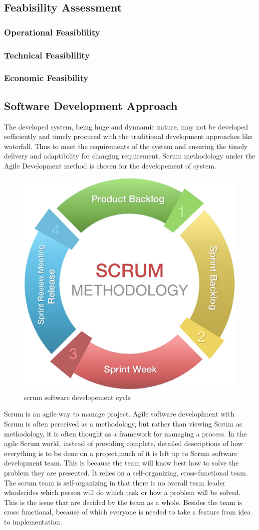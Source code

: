 \subsection{Feabisility Assessment}
\subsubsection{Operational Feasiblility}
\subsubsection{Technical Feasiblility}
\subsubsection{Economic Feasibility}
\subsection{Software Development Approach}
The developed system, being huge and dynnamic nature, may not be developed eefficiently and timely procured with the traditional development approaches like waterfall. Thus to meet the requirements of the system and ensuring the timely delivery and adaptibility for changing requirement, Scrum methodology under the Agile Development method is chosen for the developement of system.


\begin{figure}[!ht]
\centering
\includegraphics[width = 5 cm]{fig/scrum-chart.jpg}
\caption{scrum software developement cycle}
\label{fig:scrum}
\end{figure}
Scrum is an agile way to manage project. Agile software developlment with Scrum is often perceived as a methodology, but rather than viewing Scrum as methodology, it is often thought as a framework for managing a process. In the agile Scrum world, instead of providing complete, detailed descriptions of how everything is to be done on a project,much of it is left up to Scrum software development team. This is because the team will know best how to solve the problem they are presented. It relies on a self-organizing, cross-functional team. The scrum team is self-organizing in that there is no overall team leader whodecides which person will do which task or how a problem will be solved. This is the issue that are decided by the team as a whole. Besides the team is cross functional, because of which everyone is needed to take a feature from idea to implementation. 

